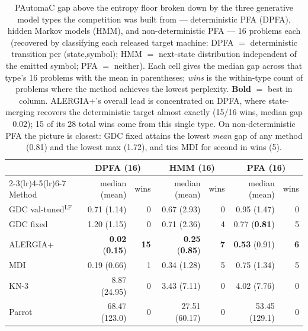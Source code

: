 \begin{table}[t]
\centering
\caption{PAutomaC gap above the entropy floor broken down by the three generative model types the competition was built from --- deterministic PFA (DPFA), hidden Markov models (HMM), and non-deterministic PFA --- 16 problems each (recovered by classifying each released target machine: DPFA $=$ deterministic transition per (state,symbol); HMM $=$ next-state distribution independent of the emitted symbol; PFA $=$ neither). Each cell gives the median gap across that type's 16 problems with the mean in parentheses; \emph{wins} is the within-type count of problems where the method achieves the lowest perplexity. \textbf{Bold} $=$ best in column. ALERGIA+'s overall lead is concentrated on DPFA, where state-merging recovers the deterministic target almost exactly (15/16 wins, median gap 0.02); 15 of its 28 total wins come from this single type. On non-deterministic PFA the picture is closest: GDC fixed attains the lowest \emph{mean} gap of any method (0.81) and the lowest max (1.72), and ties MDI for second in wins (5).}
\label{tab:pautomac_by_type}
\small
\begin{tabular}{l rr rr rr}
\toprule
 & \multicolumn{2}{c}{DPFA (16)} & \multicolumn{2}{c}{HMM (16)} & \multicolumn{2}{c}{PFA (16)} \\
\cmidrule(lr){2-3}\cmidrule(lr){4-5}\cmidrule(lr){6-7}
Method & median (mean) & wins & median (mean) & wins & median (mean) & wins \\
\midrule
GDC val-tuned$^{\mathrm{LF}}$ & 0.71 (1.14) & 0 & 0.67 (2.93) & 0 & 0.95 (1.47) & 0 \\
GDC fixed                     & 1.20 (1.15) & 0 & 0.71 (2.36) & 4 & 0.77 (\textbf{0.81}) & 5 \\
ALERGIA+                      & \textbf{0.02} (\textbf{0.15}) & \textbf{15} & \textbf{0.25} (\textbf{0.85}) & \textbf{7} & \textbf{0.53} (0.91) & \textbf{6} \\
MDI                           & 0.19 (0.66) & 1 & 0.34 (1.28) & 5 & 0.75 (1.34) & 5 \\
KN-3                          & 8.87 (24.95) & 0 & 3.43 (7.11) & 0 & 4.02 (7.76) & 0 \\
Parrot                        & 68.47 (123.0) & 0 & 27.51 (60.17) & 0 & 53.45 (129.1) & 0 \\
\bottomrule
\end{tabular}
\end{table}


